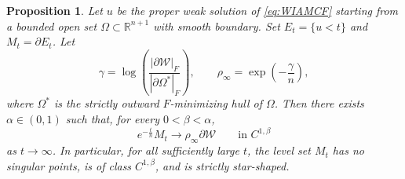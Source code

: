 \documentclass[11pt,reqno]{amsart}
\newtheorem{proposition}{Proposition}[section]
\theoremstyle{definition}
\theoremstyle{remark}
\numberwithin{equation}{section}
\begin{document}
\begin{proposition}%
\label{prop:C1-blowdown}
Let $u$ be the proper weak solution of \eqref{eq:WIAMCF} starting from a
bounded open set $\Omega\subset\mathbb R^{n+1}$ with smooth boundary.
Set $E_t=\{u<t\}$ and $M_t=\partial E_t$. Let
\begin{equation*}
 \gamma=\log\left(\frac{|\partial\mathcal W|_F}{|\partial\Omega^*|_F}\right),
 \qquad
 \rho_\infty=\exp\left(-\frac{\gamma}{n}\right),
\end{equation*}
where $\Omega^*$ is the strictly outward $F$-minimizing hull of $\Omega$.
Then there exists $\alpha\in(0,1)$ such that, for every $0<\beta<\alpha$,
\begin{equation}
\label{eq:C1-blowdown}
 e^{-\frac{t}{n}}M_t
 \longrightarrow \rho_\infty\partial\mathcal W
 \qquad\text{in }C^{1,\beta}
\end{equation}
as $t\to\infty$. In particular, for all sufficiently large $t$, the
level set $M_t$ has no singular points, is of class $C^{1,\beta}$, and
is strictly star-shaped.
\end{proposition}
\end{document}
